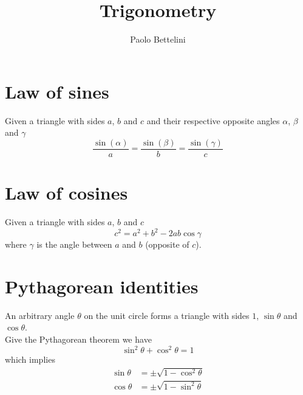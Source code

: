 \documentclass[a4paper]{article}
\title{Trigonometry}
\author{Paolo Bettelini}
\date{}
\begin{document}
\maketitle
\tableofcontents
\pagebreak

\section{Law of sines}

Given a triangle with sides \(a\), \(b\) and \(c\) and their respective opposite angles
\(\alpha\), \(\beta\) and \(\gamma\)
\[
    \frac{\sin(\alpha)}{a} =
    \frac{\sin(\beta)}{b} =
    \frac{\sin(\gamma)}{c}
\]

\section{Law of cosines}

Given a triangle with sides \(a\), \(b\) and \(c\)
\[
    c^2 = a^2 + b^2 - 2ab\cos\gamma
\]
where \(\gamma\) is the angle between \(a\) and \(b\) (opposite of \(c\)).

\section{Pythagorean identities}

An arbitrary angle \(\theta\) on the unit circle forms a triangle with sides
\(1\), \(\sin\theta\) and \(\cos\theta\).
\\
Give the Pythagorean theorem we have
\[
    \sin^2\theta + \cos^2\theta = 1
\]
which implies
\begin{align*}
    \sin\theta &= \pm \sqrt{1 - \cos^2\theta} \\
    \cos\theta &= \pm \sqrt{1 - \sin^2\theta}
\end{align*}

\pagebreak
\end{document}
